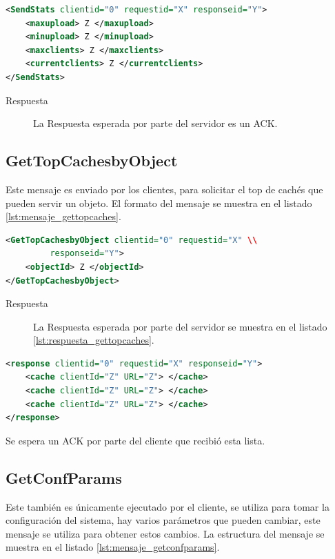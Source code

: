 \begin{lstlisting}[language=XML,caption={Mensaje de SendStats},label={lst:mensaje_sendstats}]
<SendStats clientid="0" requestid="X" responseid="Y"> 
	<maxupload> Z </maxupload>
	<minupload> Z </minupload>
	<maxclients> Z </maxclients>
	<currentclients> Z </currentclients>
</SendStats>
\end{lstlisting}

\begin{description}
\item[Respuesta] La Respuesta esperada por parte del servidor es un ACK.
\end{description}

\subsection{GetTopCachesbyObject}

Este mensaje es enviado por los clientes, para solicitar el top de cachés que pueden servir un objeto. El formato del mensaje se muestra en el listado \ref{lst:mensaje_gettopcaches}.

\begin{lstlisting}[language=XML,caption={Mensaje de GetTopCachesbyObject},label={lst:mensaje_gettopcaches}]
<GetTopCachesbyObject clientid="0" requestid="X" \\
		 responseid="Y"> 
	<objectId> Z </objectId>
</GetTopCachesbyObject>
\end{lstlisting}


\begin{description}
\item[Respuesta] La Respuesta esperada por parte del servidor se muestra en el listado \ref{lst:respuesta_gettopcaches}.
\end{description}

\begin{lstlisting}[language=XML,caption={Mensaje de Respuesta de GetTopCachesbyObject},label={lst:respuesta_gettopcaches}]
<response clientid="0" requestid="X" responseid="Y"> 
	<cache clientId="Z" URL="Z"> </cache>
	<cache clientId="Z" URL="Z"> </cache>
	<cache clientId="Z" URL="Z"> </cache>
</response>
\end{lstlisting}


Se espera un ACK por parte del cliente que recibió esta lista.

\subsection{GetConfParams}
Este también es únicamente ejecutado por el cliente, se utiliza para tomar la configuración del sistema, hay varios parámetros que pueden cambiar, este mensaje se utiliza para obtener estos cambios. La estructura del mensaje se muestra en el listado \ref{lst:mensaje_getconfparams}.

